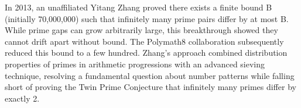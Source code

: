 In 2013, an unaffiliated Yitang Zhang proved there exists a finite bound B (initially 70,000,000) such that infinitely many prime pairs differ by at most B. While prime gaps can grow arbitrarily large, this breakthrough showed they cannot drift apart without bound. The Polymath8 collaboration subsequently reduced this bound to a few hundred. Zhang's approach combined distribution properties of primes in arithmetic progressions with an advanced sieving technique, resolving a fundamental question about number patterns while falling short of proving the Twin Prime Conjecture that infinitely many primes differ by exactly 2.
